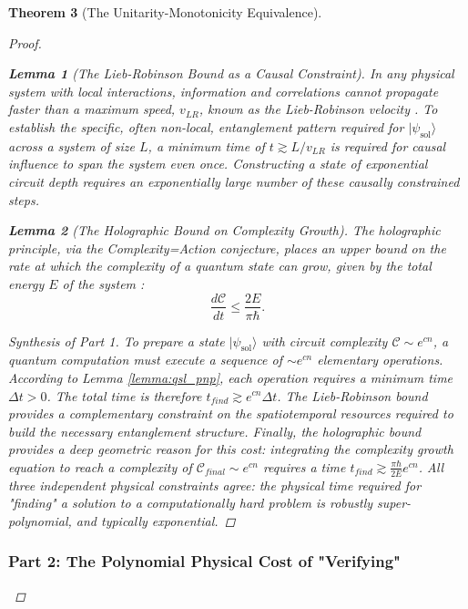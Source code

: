 \documentclass[11pt, letterpaper]{report}
\theoremstyle{plain} %
\newtheorem{theorem}{Theorem}[chapter]
\newtheorem{lemma}[theorem]{Lemma}
\theoremstyle{definition} %
\theoremstyle{remark} %
\begin{document}
\begin{theorem}[The Unitarity-Monotonicity Equivalence]
\begin{proof}
\begin{lemma}[The Lieb-Robinson Bound as a Causal Constraint]
\label{lemma:lieb_robinson_pnp}
In any physical system with local interactions, information and correlations cannot propagate faster than a maximum speed, $v_{LR}$, known as the Lieb-Robinson velocity \cite{LiebRobinson1972}. To establish the specific, often non-local, entanglement pattern required for $|\psi_{\text{sol}}\rangle$ across a system of size $L$, a minimum time of $t \gtrsim L/v_{LR}$ is required for causal influence to span the system even once. Constructing a state of exponential circuit depth requires an exponentially large number of these causally constrained steps.
\end{lemma}

\begin{lemma}[The Holographic Bound on Complexity Growth]
\label{lemma:holographic_complexity_pnp}
The holographic principle, via the Complexity=Action conjecture, places an upper bound on the rate at which the complexity of a quantum state can grow, given by the total energy $E$ of the system \cite{BrownEtAl2016Action}:
\begin{equation}
    \frac{d\mathcal{C}}{dt} \le \frac{2E}{\pi\hbar}.
\end{equation}
\end{lemma}
\begin{proof}[Synthesis of Part 1]
To prepare a state $|\psi_{\text{sol}}\rangle$ with circuit complexity $\mathcal{C} \sim e^{cn}$, a quantum computation must execute a sequence of $\sim e^{cn}$ elementary operations. According to Lemma \ref{lemma:qsl_pnp}, each operation requires a minimum time $\Delta t > 0$. The total time is therefore $t_{find} \gtrsim e^{cn} \Delta t$. The Lieb-Robinson bound provides a complementary constraint on the spatiotemporal resources required to build the necessary entanglement structure. Finally, the holographic bound provides a deep geometric reason for this cost: integrating the complexity growth equation to reach a complexity of $\mathcal{C}_{final} \sim e^{cn}$ requires a time $t_{find} \gtrsim \frac{\pi\hbar}{2E}e^{cn}$. All three independent physical constraints agree: the physical time required for "finding" a solution to a computationally hard problem is robustly super-polynomial, and typically exponential.
\end{proof}

\subsubsection*{Part 2: The Polynomial Physical Cost of "Verifying"}


\end{proof}
\end{theorem}
\end{document}
